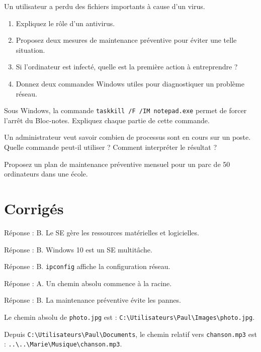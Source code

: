 \exo{}
Un utilisateur a perdu des fichiers importants à cause d'un virus.
\begin{enumerate}
    \item Expliquez le rôle d'un antivirus.
    \item Proposez deux mesures de maintenance préventive pour éviter une telle situation.
    \item Si l'ordinateur est infecté, quelle est la première action à entreprendre ?
    \item Donnez deux commandes Windows utiles pour diagnostiquer un problème réseau.
\end{enumerate}


\exo{}
Sous Windows, la commande \texttt{taskkill /F /IM notepad.exe} permet de forcer l'arrêt du Bloc-notes. Expliquez chaque partie de cette commande.

\exo{}
Un administrateur veut savoir combien de processus sont en cours sur un poste. Quelle commande peut-il utiliser ? Comment interpréter le résultat ?

\exo{}
Proposez un plan de maintenance préventive mensuel pour un parc de 50 ordinateurs dans une école.

\section{Corrigés}

Réponse : B. Le SE gère les ressources matérielles et logicielles.

Réponse : B. Windows 10 est un SE multitâche.

Réponse : B. \texttt{ipconfig} affiche la configuration réseau.

Réponse : A. Un chemin absolu commence à la racine.

Réponse : B. La maintenance préventive évite les pannes.

Le chemin absolu de \texttt{photo.jpg} est : \texttt{C:\textbackslash Utilisateurs\textbackslash Paul\textbackslash Images\textbackslash photo.jpg}.

Depuis \texttt{C:\textbackslash Utilisateurs\textbackslash Paul\textbackslash Documents}, le chemin relatif vers \texttt{chanson.mp3} est : \texttt{..\textbackslash ..\textbackslash Marie\textbackslash Musique\textbackslash chanson.mp3}.

